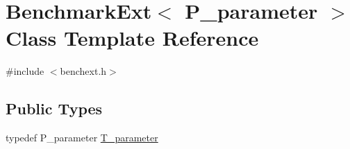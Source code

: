 \hypertarget{classBenchmarkExt}{}\section{Benchmark\+Ext$<$ P\+\_\+parameter $>$ Class Template Reference}
\label{classBenchmarkExt}


{\ttfamily \#include $<$benchext.\+h$>$}

\subsection*{Public Types}
\begin{DoxyCompactItemize}
\item 
typedef P\+\_\+parameter \hyperlink{classBenchmarkExt_a8b17d300898ee83a0c10463c1b53cfa5}{T\+\_\+parameter}
\end{DoxyCompactItemize}
